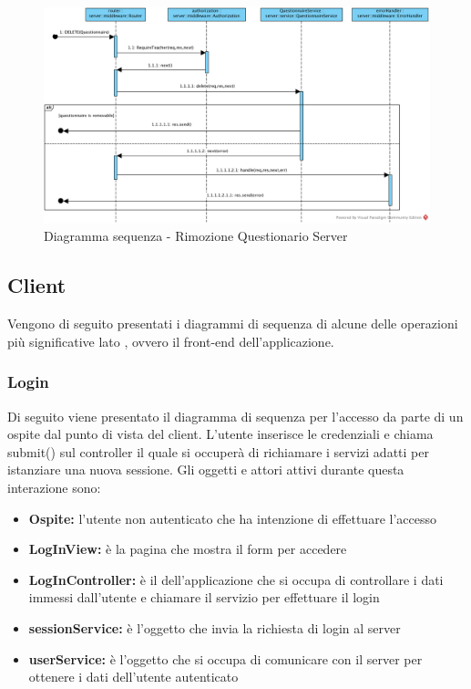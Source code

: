 \documentclass[12pt,a4paper]{article}
\begin{document}
\begin{center}
	\begin{figure}[H]
		\centering \includegraphics[max width=\myheight, angle=90]{../img/diagrammiSequenza/rimozioneQuestionarioServer.png}
		\caption{Diagramma sequenza - Rimozione Questionario Server}
	\end{figure}
\end{center}

\subsection{Client}

Vengono di seguito presentati i diagrammi di sequenza di alcune delle operazioni più significative lato , ovvero il front-end dell'applicazione.

\subsubsection{Login}
Di seguito viene presentato il diagramma di sequenza per l'accesso da parte di un ospite dal punto di vista del client. L'utente inserisce le credenziali e chiama submit() sul controller il quale si occuperà di richiamare i servizi adatti per istanziare una nuova sessione. Gli oggetti e attori attivi durante questa interazione sono:

\begin{itemize}
	\item \textbf{Ospite:} l'utente non autenticato che ha intenzione di effettuare l'accesso
	\item \textbf{LogInView:} è la pagina che mostra il form per accedere
	\item \textbf{LogInController:} è il  dell'applicazione che si occupa di controllare i dati immessi dall'utente e chiamare il servizio per effettuare il login
	\item \textbf{sessionService:} è l'oggetto che invia la richiesta di login al server
	\item \textbf{userService:} è l'oggetto che si occupa di comunicare con il server per ottenere i dati dell'utente autenticato
\end{itemize}
\end{document}
